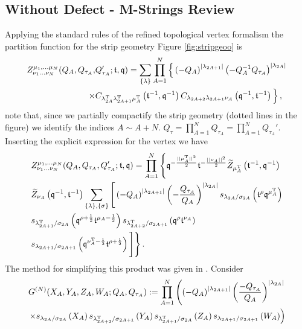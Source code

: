 \documentclass[main.tex]{subfiles}
\begin{document}
\subsection{Without Defect - M-Strings Review}
Applying the standard rules of the refined topological vertex formalism \cite{Iqbal:2007ii} the partition function for the strip geometry Figure \ref{fig:stripgeoo} is
\begin{equation}
\begin{aligned}
Z^{\mu_1,\dots\mu_N}_{\nu_1\dots\nu_N}(Q_{A},Q_{\tau_A},&Q_{\tau_A}';\mathfrak{t},\mathfrak{q})=\sum_{\{\lambda\}}\prod_{A=1}^N\Big\{\left(-Q_{A}\right)^{|\lambda_{2A+1}|}\left(-Q_{A}^{-1}Q_{\tau_{A}}\right)^{|\lambda_{2A}|}\\
\times&C_{\lambda_{2A}^{\operatorname{T}}\lambda_{2A+1}^{\operatorname{T}}\mu^{\operatorname{T}}_A}\left(\mathfrak{t}^{-1},\mathfrak{q}^{-1}\right)C_{\lambda_{2A+2}\lambda_{2A+1}\nu_A}\left(\mathfrak{q}^{-1},\mathfrak{t}^{-1}\right)\Big\}\,,
\end{aligned}
\end{equation}
note that, since we partially compactify the strip geometry (dotted lines in the figure) we identify the indices $A\sim A+N$. $Q_{\tau}=\prod_{A=1}^NQ_{\tau_A}=\prod_{A=1}^NQ_{\tau_A}'$. Inserting  the explicit expression for the vertex we have 
\begin{equation}
\begin{aligned}
&Z^{\mu_1,\dots\mu_N}_{\nu_1\dots\nu_N}(Q_{A},Q_{\tau_A},Q_{\tau_A}';\mathfrak{t},\mathfrak{q})=\prod_{A=1}^N\Bigg\{\mathfrak{q}^{-\frac{||\mu_A^{\operatorname{T}}||^2}{2}}\mathfrak{t}^{-\frac{||\nu_A||^2}{2}}\widetilde{Z}_{\mu_{A}^{\operatorname{T}}}\left(\mathfrak{t}^{-1},\mathfrak{q}^{-1}\right)\\
&\widetilde{Z}_{\nu_A}\left(\mathfrak{q}^{-1},\mathfrak{t}^{-1}\right)\sum_{\{\lambda\},\{\sigma\}}\Bigg[\left(-Q_{A}\right)^{|\lambda_{2A+1}|}\left(-\frac{Q_{\tau_{A}}}{Q_A}\right)^{|\lambda_{2A}|}s_{\lambda_{2A}/\sigma_{2A}}\left(\mathfrak{t}^{\rho}\mathfrak{q}^{\mu_A^{\operatorname{T}}}\right)\\
&s_{\lambda_{2A+1}^{\operatorname{T}}/\sigma_{2A}}\left(\mathfrak{q}^{\rho+\frac{1}{2}}\mathfrak{t}^{\mu_A-\frac{1}{2}}\right)s_{\lambda_{2A+2}^{\operatorname{T}}/\sigma_{2A+1}}\left(\mathfrak{q}^{\rho}\mathfrak{t}^{\nu_A}\right)\\
&s_{\lambda_{2A+1}/\sigma_{2A+1}}\left(\mathfrak{q}^{\nu_A^{\operatorname{T}}-\frac{1}{2}}\mathfrak{t}^{\rho+\frac{1}{2}}\right)\Bigg]\Bigg\}\,.
\end{aligned}
\end{equation}
The method for simplifying this product was given in \cite{Haghighat:2013gba,Haghighat:2013tka}. Consider
\begin{equation}
\begin{aligned}
G^{(N)}(X_A,Y_A,Z_A,W_A;Q_A,Q_{\tau_A}):=\prod_{A=1}^N\left(\left(-Q_{A}\right)^{|\lambda_{2A+1}|}\left(\frac{-Q_{\tau_{A}}}{Q_{A}}\right)^{|\lambda_{2A}|}\right.&\\
\left.\times s_{\lambda_{2A}/\sigma_{2A}}\left(X_A\right)s_{\lambda_{2A+2}^{\operatorname{T}}/\sigma_{2A+1}}\left(Y_A\right)s_{\lambda_{2A+1}^{\operatorname{T}}/\sigma_{2A}}\left(Z_A\right)s_{\lambda_{2A+1}/\sigma_{2A+1}}\left(W_A\right)\right)&
\end{aligned}
\end{equation}
\end{document}
